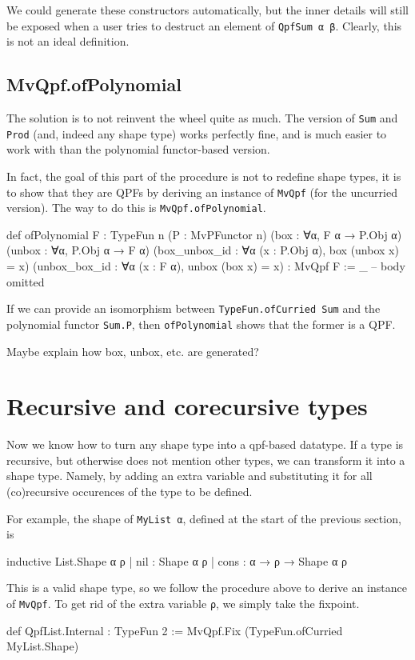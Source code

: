 \documentclass[titlepage]{report}
\newenvironment{todo}{\begin{shaded}\begin{trivlist}                         
    \item[\hskip \labelsep {\bfseries Todo:}]}{\end{trivlist}\end{shaded}}
\begin{document}
We could generate these constructors automatically, but the inner details will still be exposed
when a user tries to destruct an element of \texttt{QpfSum α β}.
Clearly, this is not an ideal definition.

\subsection{MvQpf.ofPolynomial}
The solution is to not reinvent the wheel quite as much.
The  version of \texttt{Sum} and \texttt{Prod} (and, indeed any shape type) works
perfectly fine, and is much easier to work with than the polynomial functor-based version.

In fact, the goal of this part of the procedure is not to redefine shape types, it is to show that
they are QPFs by deriving an instance of \texttt{MvQpf} (for the uncurried version).
The way to do this is \texttt{MvQpf.ofPolynomial}.

\begin{leancode}
    def ofPolynomial {F : TypeFun n} 
                     (P : MvPFunctor n) 
                     (box    : ∀{α}, F α → P.Obj α) 
                     (unbox  : ∀{α}, P.Obj α → F α) 
                     (box_unbox_id : ∀{α} (x : P.Obj α), box (unbox x) = x)
                     (unbox_box_id : ∀{α} (x : F α), unbox (box x) = x)
                  : MvQpf F
        := _ -- body omitted
\end{leancode}

If we can provide an isomorphism between \texttt{TypeFun.ofCurried Sum} and the polynomial functor \texttt{Sum.P}, 
then \texttt{ofPolynomial} shows that the former is a QPF.

\begin{todo}
    Maybe explain how box, unbox, etc. are generated?
\end{todo}






\section{Recursive and corecursive types}
Now we know how to turn any shape type into a qpf-based datatype.
If a type is recursive, but otherwise does not mention other types, we can transform it into a shape
type.
Namely, by adding an extra variable and substituting it for all (co)recursive occurences of the type
to be defined.

For example, the shape of \texttt{MyList α}, defined at the start of the previous section, is
\begin{leancode}
    inductive List.Shape α ρ
      | nil  : Shape α ρ
      | cons : α → ρ → Shape α ρ
\end{leancode}
This is a valid shape type, so we follow the procedure above to derive an instance of \texttt{MvQpf}.
To get rid of the extra variable \texttt{ρ}, we simply take the fixpoint.
\begin{leancode}
    def QpfList.Internal : TypeFun 2 
        := MvQpf.Fix (TypeFun.ofCurried MyList.Shape)

\end{leancode}
\end{document}
